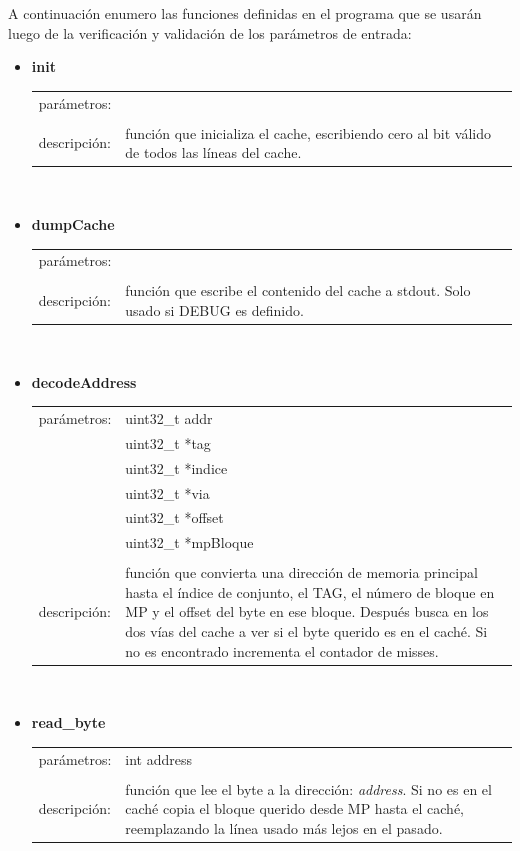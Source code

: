 \documentclass[a4paper]{article}
\begin{document}
A continuación enumero las funciones definidas en el programa que se usarán luego de la verificación y validación de los parámetros de entrada: 
\begin{itemize}
\item \textbf{init}\\
	\begin{tabular}{l p{12cm}}
    parámetros: &\\
    &\\
    descripción: &función que inicializa el cache, escribiendo cero al bit válido de todos las líneas del cache.
    \end{tabular}\\

\item \textbf{dumpCache}\\
	\begin{tabular}{l p{12cm}}
    parámetros: &\\
    &\\
    descripción: &función que escribe el contenido del cache a stdout. Solo usado si DEBUG es definido.
    \end{tabular}\\

\item \textbf{decodeAddress}\\
	\begin{tabular}{l p{12cm}}
    parámetros: &uint32\_t addr \\
                &uint32\_t *tag \\
                &uint32\_t *indice \\
                &uint32\_t *via \\
                &uint32\_t *offset \\
                &uint32\_t *mpBloque \\
    &\\
    descripción: &función que convierta una dirección de memoria principal hasta el índice de conjunto, el TAG, el número de bloque en MP y el offset del byte en ese bloque. Después busca en los dos vías del cache a ver si el byte querido es en el caché. Si no es encontrado incrementa el contador de misses.
    \end{tabular}\\

\item \textbf{read\_byte}\\
	\begin{tabular}{l p{12cm}}
    parámetros: &int address \\
    &\\
    descripción: &función que lee el byte a la dirección: \textit{address}. Si no es en el caché copia el bloque querido desde MP hasta el caché, reemplazando la línea usado más lejos en el pasado.
    \end{tabular}\\


\end{itemize}
\end{document}

